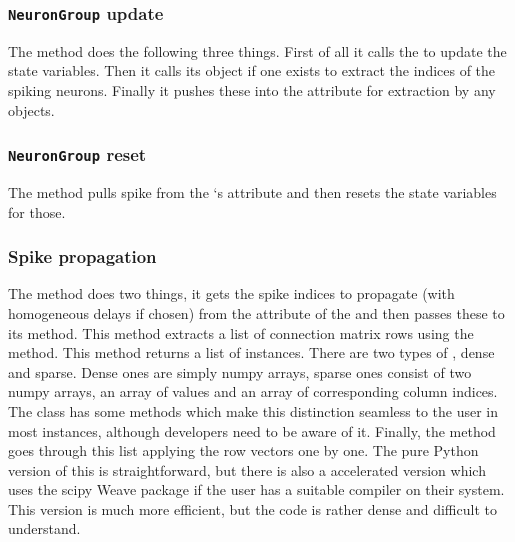 \documentclass[letterpaper,10pt,english]{manual}
\begin{document}
\subsubsection{\texttt{NeuronGroup} update}

The  method does the following three things. First of
all it calls the  to update the state variables. Then it calls
its  object if one exists to extract the indices of the spiking
neurons. Finally it pushes these into the  attribute for extraction by
any  objects.


\subsubsection{\texttt{NeuronGroup} reset}

The  method pulls spike from the `s
 attribute and then resets the state variables for those.


\subsubsection{Spike propagation}

The  method does two things, it gets the spike
indices to propagate (with homogeneous delays if chosen) from the 
attribute of the  and then passes these to its
 method. This method extracts a list of connection
matrix rows using the  method. This method
returns a list of  instances. There are two types of
, dense and sparse. Dense ones are simply numpy arrays,
sparse ones consist of two numpy arrays, an array of values and an array of
corresponding column indices. The  class has
some methods which make this distinction seamless to the user in most instances,
although developers need to be aware of it. Finally, the
 method goes through this list applying the row
vectors one by one. The pure Python version of this is straightforward, but
there is also a  accelerated version which uses the scipy Weave package
if the user has a suitable compiler on their system. This version is much more
efficient, but the code is rather dense and difficult to understand.

\resetcurrentobjects
\hypertarget{--doc-developer-packagestructure}{}
\end{document}
